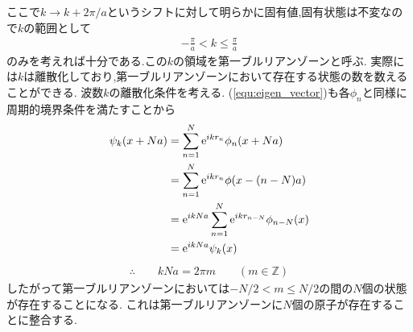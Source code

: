 ここで$k\rightarrow k+2\pi/a$というシフトに対して明らかに固有値,固有状態は不変なので$k$の範囲として
\begin{align}
  -\frac{\pi}{a}<k\leq\frac{\pi}{a}
\end{align}
のみを考えれば十分である.この$k$の領域を第一ブルリアンゾーンと呼ぶ.
実際には$k$は離散化しており,第一ブルリアンゾーンにおいて存在する状態の数を数えることができる.
波数$k$の離散化条件を考える.
(\ref{equ:eigen_vector})も各$\phi_n$と同様に周期的境界条件を満たすことから
\begin{align}
  \begin{split}
    \psi_k(x+Na)&=\sum_{n=1}^N{\rm e}^{ikr_n}\phi_n(x+Na)\\
    &=\sum_{n=1}^N{\rm e}^{ikr_n}\phi(x-(n-N)a)\\
    &={\rm e}^{ikNa}\sum_{n=1}^N{\rm e}^{ikr_{n-N}}\phi_{n-N}(x)\\
    &={\rm e}^{ikNa}\psi_k(x)\\
  \end{split}
\end{align}
\begin{align}
  \therefore\qquad kNa=2\pi m\qquad(m\in\mathbb{Z})
\end{align}
したがって第一ブルリアンゾーンにおいては$-N/2<m\leq N/2$の間の$N$個の状態が存在することになる.
これは第一ブルリアンゾーンに$N$個の原子が存在することに整合する.